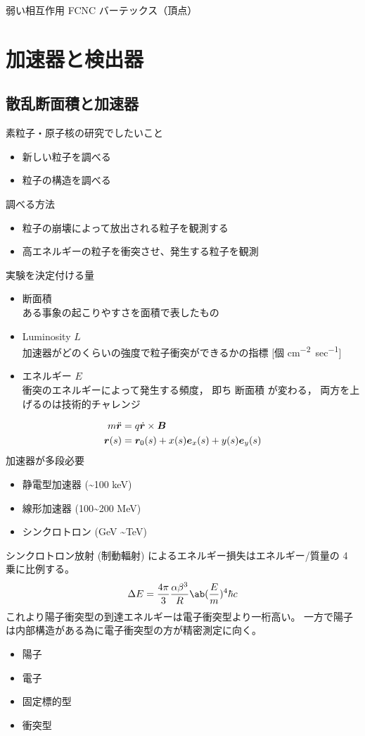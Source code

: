 \documentclass[a4paper,11pt]{jlreq}
\begin{document}
弱い相互作用
FCNC
バーテックス（頂点）



\section{加速器と検出器}

\subsection{散乱断面積と加速器}
素粒子・原子核の研究でしたいこと
\begin{itemize}
  \item 新しい粒子を調べる
  \item 粒子の構造を調べる
\end{itemize}
調べる方法
\begin{itemize}
  \item 粒子の崩壊によって放出される粒子を観測する
  \item 高エネルギーの粒子を衝突させ、発生する粒子を観測
\end{itemize}
実験を決定付ける量
\begin{itemize}
  \item 断面積 \\
        ある事象の起こりやすさを面積で表したもの
  \item Luminosity $L$ \\
        加速器がどのくらいの強度で粒子衝突ができるかの指標 [個 \si{cm^{-2}sec^{-1}}]
  \item エネルギー $E$ \\
        衝突のエネルギーによって発生する頻度，
        即ち 断面積 が変わる， 両方を上げるのは技術的チャレンジ
\end{itemize}
\begin{align}
  m\ddot{\bm{r}} & = q\dot{\bm{r}}\times\bm{B}                            \\
  \bm{r}(s)    & = \bm{r}_0(s) + x(s)\bm{e}_x(s) + y(s)\bm{e}_y(s)
\end{align}
加速器が多段必要
\begin{itemize}
  \item 静電型加速器 (\sim 100 \si{keV})
  \item 線形加速器 (100\sim 200 \si{MeV})
  \item シンクロトロン (\si{GeV} \sim \si{TeV})
\end{itemize}
シンクロトロン放射 (制動輻射) によるエネルギー損失はエネルギー/質量の 4 乗に比例する。
\begin{align}
  \Delta E = \frac{4\pi}{3}\frac{\alpha\beta^3}{R}\ab(\frac{E}{m})^4\hbar c
\end{align}
これより陽子衝突型の到達エネルギーは電子衝突型より一桁高い。
一方で陽子は内部構造がある為に電子衝突型の方が精密測定に向く。
\begin{itemize}
  \item 陽子
  \item 電子
\end{itemize}
\begin{itemize}
  \item 固定標的型
  \item 衝突型
\end{itemize}
\end{document}
